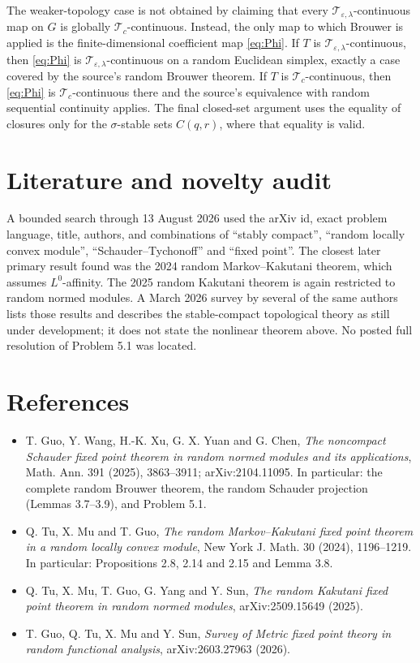 \documentclass[11pt]{article}
\newcommand{\Tc}{\mathcal T_c}
\newcommand{\Tel}{\mathcal T_{\varepsilon,\lambda}}
\begin{document}
The weaker-topology case is not obtained by claiming that every
$\Tel$-continuous map on $G$ is globally $\Tc$-continuous.  Instead, the
only map to which Brouwer is applied is the finite-dimensional coefficient
map \eqref{eq:Phi}.  If $T$ is $\Tel$-continuous, then \eqref{eq:Phi} is
$\Tel$-continuous on a random Euclidean simplex, exactly a case covered by
the source's random Brouwer theorem.  If $T$ is $\Tc$-continuous, then
\eqref{eq:Phi} is $\Tc$-continuous there and the source's equivalence with
random sequential continuity applies.  The final closed-set argument uses
the equality of closures only for the $\sigma$-stable sets $C(q,r)$, where
that equality is valid.

\section*{Literature and novelty audit}

A bounded search through 13 August 2026 used the arXiv id, exact problem
language, title, authors, and combinations of ``stably compact'', ``random
locally convex module'', ``Schauder--Tychonoff'' and ``fixed point''.  The
closest later primary result found was the 2024 random Markov--Kakutani
theorem, which assumes $L^0$-affinity.  The 2025 random Kakutani theorem is
again restricted to random normed modules.  A March 2026 survey by several
of the same authors lists those results and describes the stable-compact
topological theory as still under development; it does not state the
nonlinear theorem above.  No posted full resolution of Problem 5.1 was
located.

\section*{References}

\begin{itemize}[leftmargin=2em]
\item T. Guo, Y. Wang, H.-K. Xu, G. X. Yuan and G. Chen,
\emph{The noncompact Schauder fixed point theorem in random normed modules
and its applications}, Math. Ann. 391 (2025), 3863--3911;
arXiv:2104.11095.  In particular: the complete random Brouwer theorem,
the random Schauder projection (Lemmas 3.7--3.9), and Problem 5.1.
\item Q. Tu, X. Mu and T. Guo, \emph{The random Markov--Kakutani fixed
point theorem in a random locally convex module}, New York J. Math. 30
(2024), 1196--1219.  In particular: Propositions 2.8, 2.14 and 2.15 and
Lemma 3.8.
\item Q. Tu, X. Mu, T. Guo, G. Yang and Y. Sun, \emph{The random Kakutani
fixed point theorem in random normed modules}, arXiv:2509.15649 (2025).
\item T. Guo, Q. Tu, X. Mu and Y. Sun, \emph{Survey of Metric fixed point
theory in random functional analysis}, arXiv:2603.27963 (2026).
\end{itemize}
\end{document}
